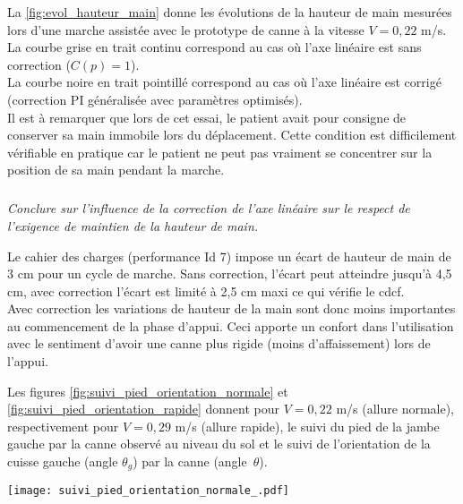 \begin{multicols}{2}
La \ref{fig:evol_hauteur_main} donne les évolutions de la hauteur de main mesurées lors d'une marche assistée avec le prototype de canne à la vitesse $V = 0,22$ m/s.\\ La courbe grise en trait continu correspond au cas où l'axe linéaire est sans correction ($C(p) = 1$).\\ La courbe noire en trait pointillé correspond au cas où l'axe linéaire est corrigé (correction PI généralisée avec paramètres optimisés). \\Il est à remarquer que lors de cet essai, le patient avait pour consigne de conserver sa main immobile lors du déplacement. Cette condition est difficilement vérifiable en pratique car le patient ne peut pas vraiment se concentrer sur la position de sa main pendant la marche.
\vspace{1em}
\fi

\subparagraph{}\textit{Conclure sur l'influence de la correction de l'axe linéaire sur le respect de l'exigence de maintien de la hauteur de main.}

\ifprof
\begin{corrige}
Le cahier des charges (performance Id 7) impose un écart de hauteur de main de 3 cm pour un cycle de marche. Sans correction, l'écart peut atteindre jusqu'à 4,5 cm, avec correction l'écart est limité à 2,5 cm maxi ce qui vérifie le cdcf.\\
Avec correction les variations de hauteur de la main sont donc moins importantes au commencement de la phase d'appui. Ceci apporte un confort dans l'utilisation avec le sentiment d'avoir une canne plus rigide (moins d'affaissement) lors de l'appui.
\end{corrige}
\fi


\ifprof
\else
\vspace{1em}
Les figures \ref{fig:suivi_pied_orientation_normale} et \ref{fig:suivi_pied_orientation_rapide} donnent pour $V = 0,22$ m/s (allure normale), respectivement pour $V = 0,29$ m/s (allure rapide), le suivi du pied de la jambe gauche par la canne observé au niveau du sol et le suivi de l'orientation de la cuisse gauche (angle $\theta_g$) par la canne (angle~$\theta$).


\begin{center}%
\texttt{[image: suivi\_pied\_orientation\_normale\_.pdf]}
\end{center}


\end{multicols}
